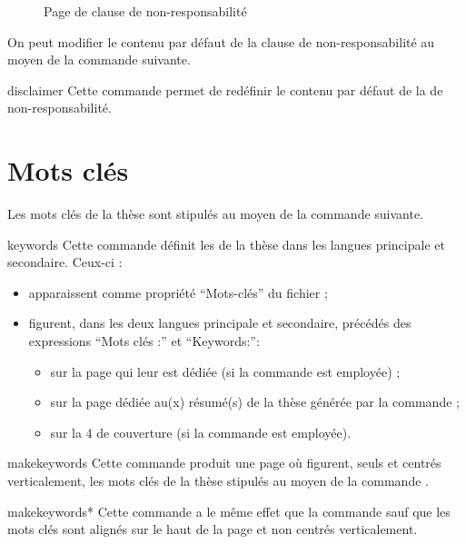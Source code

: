 \begin{figure}[htbp]
  \centering
  \caption{Page de clause de non-responsabilité}
  \label{fig:disclaimerpage}
\end{figure}

On peut modifier le contenu par défaut de la clause de non-responsabilité au
moyen de la commande  suivante.

\begin{docCommand}{disclaimer}{}
  Cette commande permet de redéfinir le contenu par défaut de la
   de non-responsabilité.
\end{docCommand}

\section{Mots clés}\label{sec:mots-cles}

Les mots clés de la thèse sont stipulés au moyen de la commande
 suivante.
%
\begin{docCommand}[doc description=\mandatory]{keywords}{}
  Cette commande définit les  de la thèse dans
  les langues principale et secondaire. Ceux-ci :
  \begin{itemize}
  \item apparaissent comme propriété \enquote{Mots-clés} du fichier \pdf
     ;
  \item figurent, dans les deux langues principale et secondaire, précédés des
    expressions \enquote{Mots clés :} et
    \foreignquote{english}{Keywords:}\selonlangue :
    \begin{itemize}
    \item sur la page qui leur est dédiée (si la commande 
      est employée) ;
    \item sur la page dédiée au(x) résumé(s) de la thèse générée par la
      commande  ;
    \item sur la 4\ieme{} de couverture (si la commande 
      est employée).
    \end{itemize}
  \end{itemize}
\end{docCommand}
%
\begin{docCommand}{makekeywords}{}
  Cette commande produit une page où figurent, seuls et centrés
  verticalement, les mots clés de la thèse stipulés au moyen de la commande
  .
\end{docCommand}
%
\begin{docCommand}{makekeywords*}{}
  Cette commande a le même effet que la commande
   sauf que les mots clés sont alignés sur le haut de la
  page et non centrés verticalement.
\end{docCommand}

